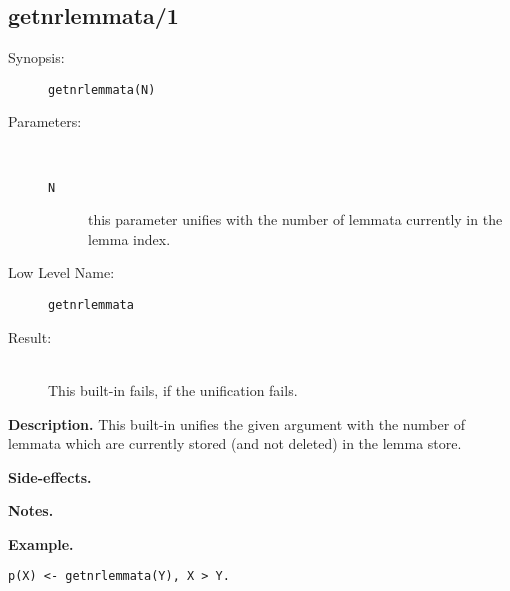 %
%
%
\subsection{getnrlemmata/1}

\begin{description}
\item[Synopsis:]
	{\tt getnrlemmata(N)}
\item[Parameters:]\ \\[-0.5cm]
	\begin{description}
	\item[{\tt N}]
this parameter unifies with the number of lemmata currently in the
lemma index.

	\end{description}
\item[Low Level Name:]
	{\tt getnrlemmata}
\item[Result:]\ \\
This built-in fails, if the unification fails.

\end{description}

\vspace*{0.5cm}
\noindent
{\bf Description.}
This built-in unifies the given argument with the number
of lemmata which are currently stored (and not deleted) in the
lemma store.
 


\vspace*{0.5cm}
\noindent
{\bf Side-effects.}

\vspace*{0.5cm}
\noindent
{\bf Notes.}

\vspace*{0.5cm}
\noindent
{\bf Example.}
\begin{verbatim}
p(X) <- getnrlemmata(Y), X > Y.
\end{verbatim}



